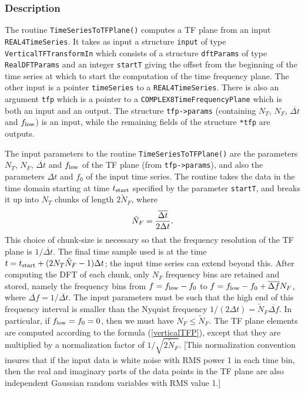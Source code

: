 \subsubsection*{Description}

The routine \verb+TimeSeriesToTFPlane()+ computes a TF plane from an input 
\verb+REAL4TimeSeries+.  It takes as input a structure \verb+input+ of type
\verb+VerticalTFTransformIn+ which consists of a structure \verb+dftParams+ of
type \verb+RealDFTParams+ and an integer \verb+startT+ giving the 
offset from the beginning of the time series at which to start the
computation of the time frequency plane.  The other input is a pointer
\verb+timeSeries+ to a \verb+REAL4TimeSeries+.  There is also an
argument \verb+tfp+ which is a pointer to a
\verb+COMPLEX8TimeFrequencyPlane+ which is both an input and an
output.  The structure \verb+tfp->params+ (containing $N_T$, $N_F$,
${\overline {\Delta t}}$ and $f_{\rm low}$) is an input, while the
remaining fields of the structure \verb+*tfp+ are outputs.

The input parameters to the routine \verb+TimeSeriesToTFPlane()+ are the
parameters $N_T$, $N_F$, ${\overline {\Delta t}}$ and $f_{\rm low}$ of the TF
plane (from \verb+tfp->params+), and also the parameters $\Delta t$ and $f_0$
of the input time series.  The routine takes the data in the time domain
starting at time $t_{\rm start}$ specified by the parameter \verb+startT+, and
breaks it up into $N_T$ chunks of length $2 {\tilde N}_F$, where
\begin{equation}
{\tilde N}_F = { {\overline {\Delta t}} \over 2 \Delta t}.
\end{equation}
This choice of chunk-size is necessary so that the frequency resolution of the
TF plane is $1/{\overline {\Delta t}}$.  The final time sample used is at the
time $t = t_{\rm start} + (2 N_T {\tilde N}_F-1) \Delta t$; the input time
series can extend beyond this.  After computing the DFT of each chunk, only
$N_F$ frequency bins are retained and stored, namely the frequency bins from
$f = f_{\rm low} - f_0$ to $f = f_{\rm low} - f_0 + {\overline {\Delta f}}
N_F$, where ${\overline {\Delta f}} = 1 / {\overline {\Delta t}}$.  The input
parameters must be such that the high end of this  frequency interval is
smaller than the Nyquist frequency $1 / (2 \Delta t) = {\tilde N}_F {\overline
{\Delta f}}$.  In particular, if $f_{\rm low} = f_0 =0$, then we must have
$N_F \le {\tilde N}_F$.  The TF plane elements are computed according to the
formula (\ref{verticalTFP}), except that they are multiplied by a
normalization factor of $1/\sqrt{2 {\tilde N}_F}$.  [This normalization
convention insures that if the input data is white noise with RMS power 1 in
each time bin, then the real and imaginary parts of the data points in the TF
plane are also independent Gaussian random variables with RMS value 1.]  
 
